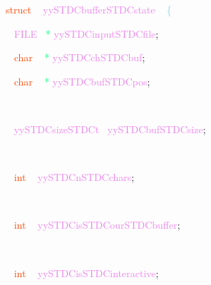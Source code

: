 \documentclass[8, usernames, dvipsnames]{beamer}
\begin{document}
\begin{frame}
\textcolor{OrangeRed}{struct}
\textcolor{White}{\ }
\textcolor{Violet}{yySTDCbufferSTDCstate}
 \textcolor{White}{\   }
\textcolor{SkyBlue}{\{ }

 \textcolor{White}{\   }
\textcolor{Violet}{FILE}\textcolor{White}{\ }
\textcolor{SpringGreen}{*}
\textcolor{Violet}{yySTDCinputSTDCfile}\textcolor{Sepia}{;}

 
 \textcolor{White}{\   }
\textcolor{OrangeRed}{char}
\textcolor{White}{\ }
\textcolor{SpringGreen}{*}
\textcolor{Violet}{yySTDCchSTDCbuf}\textcolor{Sepia}{;}
\textcolor{White}{\   }
\textcolor{White}{\   }

 \textcolor{White}{\   }
\textcolor{OrangeRed}{char}
\textcolor{White}{\ }
\textcolor{SpringGreen}{*}
\textcolor{Violet}{yySTDCbufSTDCpos}\textcolor{Sepia}{;}
\textcolor{White}{\   }
\textcolor{White}{\   }

 
 \textcolor{White}{\   }

 \textcolor{White}{\   }
\textcolor{Violet}{yySTDCsizeSTDCt}\textcolor{White}{\ }
\textcolor{Violet}{yySTDCbufSTDCsize}\textcolor{Sepia}{;}

 
 \end{frame}
\begin{frame}
\textcolor{White}{\   }

 \textcolor{White}{\   }
\textcolor{OrangeRed}{int}
\textcolor{White}{\ }
\textcolor{Violet}{yySTDCnSTDCchars}\textcolor{Sepia}{;}

 
 \textcolor{White}{\   }

 \textcolor{White}{\   }
\textcolor{OrangeRed}{int}
\textcolor{White}{\ }
\textcolor{Violet}{yySTDCisSTDCourSTDCbuffer}\textcolor{Sepia}{;}

 
 \textcolor{White}{\   }

 \textcolor{White}{\   }
\textcolor{OrangeRed}{int}
\textcolor{White}{\ }
\textcolor{Violet}{yySTDCisSTDCinteractive}\textcolor{Sepia}{;}

 
 \textcolor{White}{\   }

 \end{frame}
\end{document}
